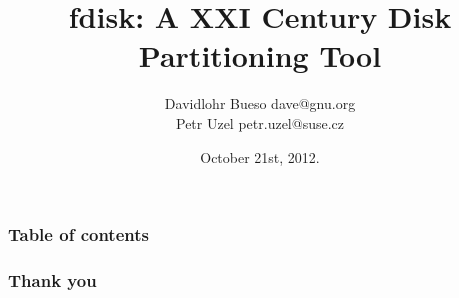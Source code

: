 \documentclass{beamer}
\begin{document}
\title{fdisk: A XXI Century Disk Partitioning Tool}
\author{Davidlohr Bueso dave@gnu.org \\ Petr Uzel petr.uzel@suse.cz}
\date{October 21st, 2012.}

\begin{frame}
\titlepage
\end{frame}

\begin{frame}\frametitle{Table of contents}\tableofcontents
\end{frame}






\begin{frame}\frametitle{Thank you}
\end{frame}
\end{document}
